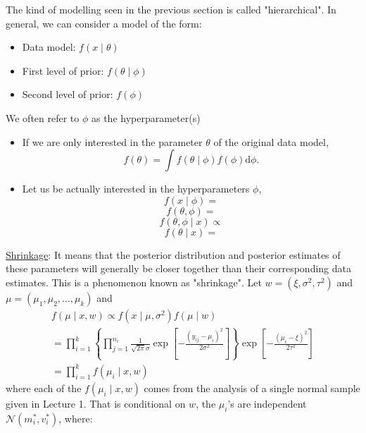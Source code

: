 \documentclass[lecture,12pt,]{pcms-l}
\numberwithin{section}{chapter}
\numberwithin{equation}{chapter}
\theoremstyle{plain}
\theoremstyle{definition}
\theoremstyle{definition}
\begin{document}
The kind of modelling seen in the previous section is called "hierarchical". In general, we can consider a model of the form:
\begin{itemize}
\item Data model: $f(x \mid \theta)$
\item First level of prior: $f(\theta \mid \phi)$
\item Second level of prior: $f(\phi)$
\end{itemize}
We often refer to $\phi$ as the hyperparameter(s)
\begin{itemize}
\item If we are only interested in the parameter $\theta$ of the original data model,
\begin{equation}
f(\theta)=\int f(\theta \mid \phi) f(\phi) \mathrm{d} \phi.
\end{equation}
\item Let us be actually interested in the hyperparameters $\phi$,
\begin{equation}
f(x \mid \phi)=
\end{equation}
\begin{equation}
f(\theta, \phi)=
\end{equation}
\begin{equation}
f(\theta,\phi \mid x) \propto
\end{equation}
\begin{equation}
f(\theta \mid x)=
\end{equation}
\end{itemize}
\underline{Shrinkage}: It means that the posterior distribution and posterior estimates of these parameters will generally be closer together than their corresponding data estimates. This is a phenomenon known as "shrinkage". Let $w=(\xi, \sigma^2, \tau^2)$ and $\mu=(\mu_1,\mu_2,...,\mu_k)$ and 
\begin{equation}
\begin{split}
f(\mu \mid x, w)\propto f(x \mid \mu, \sigma^2)f(\mu \mid w)
\\
= \prod_{i=1}^{k} \left \{  \prod_{j=1}^{n_i}\frac{1}{\sqrt{2 \pi} \sigma}  \exp \left [  - \frac{(y_{ij}-\mu_i)^2}{2 \sigma^2} \right] \right \}  \exp  \left [- \frac{(\mu_{i}-\xi)^2}{2 \tau^2}\right ]
\\
= \prod_{i=1}^{k}f(\mu_i \mid x, w)
\end{split}
\end{equation}
where each of the $f(\mu_i \mid x, w)$ comes from the analysis of a single normal sample given in Lecture 1. That is conditional on $w$, the $\mu_i$'s are independent $\mathcal{N}(m_{i}^*,v_{i}^*)$, where:
\end{document}
